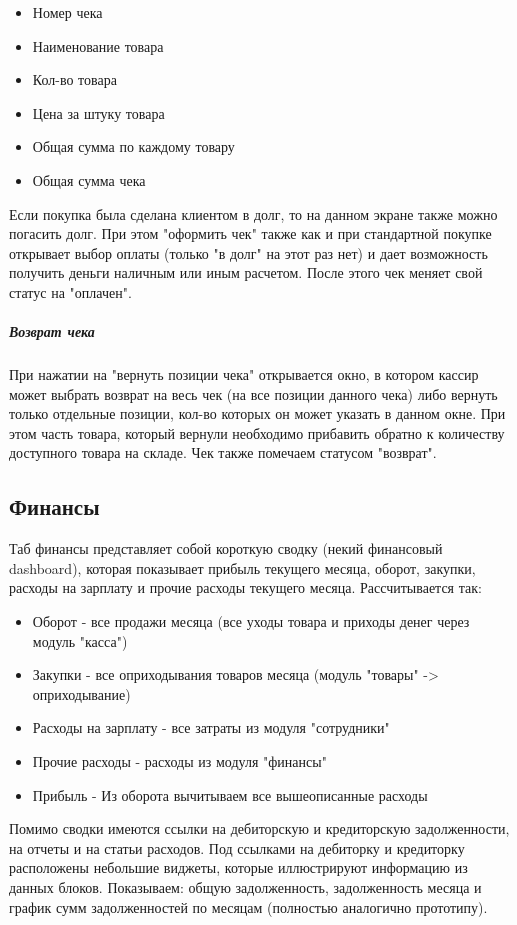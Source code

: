 \documentclass[DIV=calc, paper=a4, fontsize=11pt]{scrartcl} %
\begin{document}
\begin{itemize}
	\item Номер чека
	\item Наименование товара
	\item Кол-во товара
	\item Цена за штуку товара
	\item Общая сумма по каждому товару
	\item Общая сумма чека
\end{itemize}

Если покупка была сделана клиентом в долг, то на данном экране также можно погасить долг. При этом "оформить чек" также как и при стандартной покупке открывает выбор оплаты (только "в долг" на этот раз нет) и дает возможность получить деньги наличным или иным расчетом. После этого чек меняет свой статус на "оплачен".

\subparagraph{Возврат чека}
При нажатии на "вернуть позиции чека" открывается окно, в котором кассир может выбрать возврат на весь чек (на все позиции данного чека) либо вернуть только отдельные позиции, кол-во которых он может указать в данном окне. При этом часть товара, который вернули необходимо прибавить обратно к количеству доступного товара на складе. Чек также помечаем статусом "возврат".

\subsection{Финансы}

Таб финансы представляет собой короткую сводку (некий финансовый dashboard), которая показывает прибыль текущего месяца, оборот, закупки, расходы на зарплату и прочие расходы текущего месяца. Рассчитывается так:

\begin{itemize}
	\item Оборот - все продажи месяца (все уходы товара и приходы денег через модуль "касса")
	\item Закупки - все оприходывания товаров месяца (модуль "товары" -> оприходывание)
	\item Расходы на зарплату - все затраты из модуля "сотрудники"
	\item Прочие расходы - расходы из модуля "финансы"
	\item Прибыль - Из оборота вычитываем все вышеописанные расходы
\end{itemize}

Помимо сводки имеются ссылки на дебиторскую и кредиторскую задолженности, на отчеты и на статьи расходов. Под ссылками на дебиторку и кредиторку расположены небольшие виджеты, которые иллюстрируют информацию из данных блоков. Показываем: общую задолженность, задолженность месяца и график сумм задолженностей по месяцам (полностью аналогично прототипу).
\end{document}
